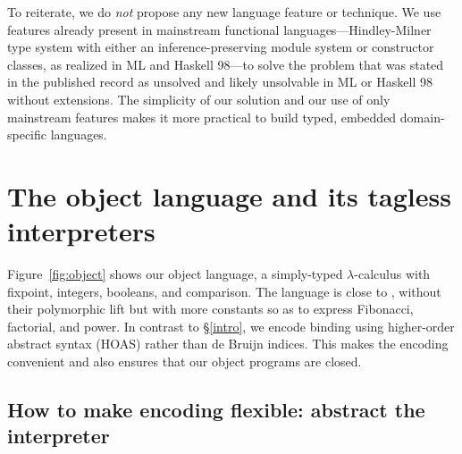 To reiterate, we do \emph{not} propose any new language
feature or technique. We use features already present in
mainstream functional languages---Hindley-Milner
type system with either an inference\hyp preserving module system or
constructor classes, as realized in ML and Haskell 98---to
solve the problem that was stated in the published record as
unsolved and likely unsolvable in ML or Haskell 98
without extensions. The simplicity of our solution and our
use of only mainstream features makes it more practical to build typed,
embedded domain\hyp specific languages.
\begin{comment}
We may claim some contribution about type-preserving CPS. Check
related work section in \cite{Guillemette-Monier-PLPV}, especially
check the work of Shao on type-preserving CPS in Flint. The PLPV paper
in related work shows other tasks, including closure conversion, which
we may tackle in our approach. We may be able to write a
type-preserving, assured compiler, whose properties and assured by HM.
\end{comment}


\section{The object language and its tagless interpreters}\label{language}

Figure~\ref{fig:object} shows our object language, a simply-typed
$\lambda$-calculus with fixpoint, integers, booleans, and comparison.
The language is close to , without their polymorphic
lift but with more constants so as to express Fibonacci, factorial, and
power.
In contrast to \S\ref{intro}, we encode binding using higher-order
abstract syntax (HOAS) \cite{miller-manipulating,pfenning-higher-order}
rather than de Bruijn indices. This makes the encoding convenient and
also ensures that our object programs are closed.

\subsection{How to make encoding flexible: abstract the interpreter}
\label{encoding}

